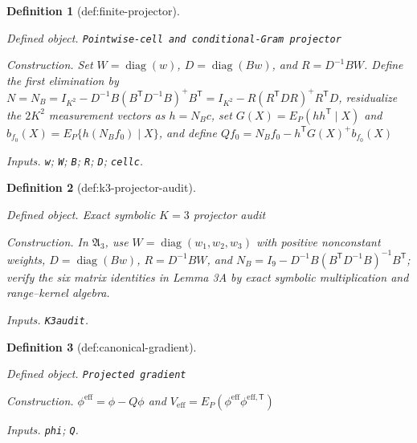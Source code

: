 \documentclass{article}
\newtheorem{definition}{Definition}
\begin{document}
\begin{definition}[def:finite-projector]\label{def:finite-projector}
\par\smallskip\noindent\emph{Defined object.} \texttt{Pointwise-\allowbreak{}cell and conditional-\allowbreak{}Gram projector}
\par\smallskip\noindent\emph{Construction.} Set \(W=\operatorname{diag}(w)\), \(D=\operatorname{diag}(Bw)\), and \(R=D^{-1}BW\). Define the first elimination by \(N=N_B=I_{K^{2}}-D^{-1}B(B^{\mathsf T}D^{-1}B)^{+}B^{\mathsf T}=I_{K^{2}}-R(R^{\mathsf T}DR)^{+}R^{\mathsf T}D\), residualize the \(2K^{2}\) measurement vectors as \(h=N_Bc\), set \(G(X)=E_P(hh^{\mathsf T}\mid X)\) and \(b_{f_0}(X)=E_P\{h(N_Bf_0)\mid X\}\), and define \(Qf_0=N_Bf_0-h^{\mathsf T}G(X)^{+}b_{f_0}(X)\)
\par\smallskip\noindent\emph{Inputs.} \texttt{w}; \texttt{W}; \texttt{B}; \texttt{R}; \texttt{D}; \texttt{cellc}.
\end{definition}

\begin{definition}[def:k3-projector-audit]\label{def:k3-projector-audit}
\par\smallskip\noindent\emph{Defined object.} Exact symbolic \(K=3\) projector audit
\par\smallskip\noindent\emph{Construction.} In \(\mathfrak A_3\), use \(W=\operatorname{diag}(w_1,w_2,w_3)\) with positive nonconstant weights, \(D=\operatorname{diag}(Bw)\), \(R=D^{-1}BW\), and \(N_B=I_9-D^{-1}B(B^{\mathsf T}D^{-1}B)^{-1}B^{\mathsf T}\); verify the six matrix identities in Lemma 3A by exact symbolic multiplication and range--kernel algebra.
\par\smallskip\noindent\emph{Inputs.} \texttt{K3audit}.
\end{definition}

\begin{definition}[def:canonical-gradient]\label{def:canonical-gradient}
\par\smallskip\noindent\emph{Defined object.} \texttt{Projected gradient}
\par\smallskip\noindent\emph{Construction.} \(\phi^{\mathrm{eff}}=\phi-Q\phi\) and \(V_{\mathrm{eff}}=E_P(\phi^{\mathrm{eff}}\phi^{\mathrm{eff},\mathsf T})\)
\par\smallskip\noindent\emph{Inputs.} \texttt{phi}; \texttt{Q}.
\end{definition}
\end{document}

